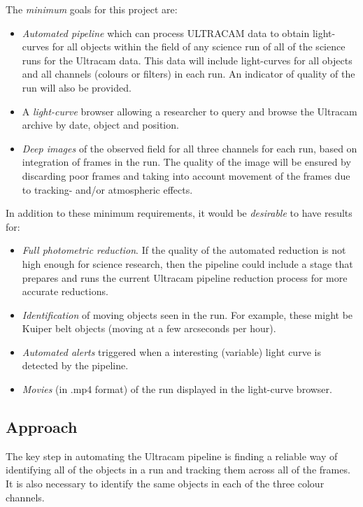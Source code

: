 \documentclass[a4paper,10pt]{article}
\begin{document}
The \emph{minimum} goals for this project are:
\begin{itemize}
	\item \emph{Automated pipeline} which can process ULTRACAM data to obtain light-curves for all objects within the field of any science run of all of the science runs for the Ultracam data. This data will include light-curves for all objects and all channels (colours or filters) in each run. An indicator of quality of the run will also be provided. 
	\item A \emph{light-curve} browser allowing a researcher to query and browse the Ultracam archive by date, object and position.
	\item \emph{Deep images} of the observed field for all three channels for each run, based on integration of frames in the run. The quality of the image will be ensured by discarding poor frames and taking into account movement of the frames due to tracking- and/or atmospheric effects. 
\end{itemize}

In addition to these minimum requirements, it would be \emph{desirable} to have results for:

\begin{itemize}
	\item \emph{Full photometric reduction}. If the quality of the automated reduction is not high enough for science research, then the pipeline could include a stage that prepares and runs the current Ultracam pipeline reduction process for more accurate reductions.
	\item \emph{Identification} of moving objects seen in the run. For example, these might be Kuiper belt objects (moving at a few arcseconds per hour).
	\item \emph{Automated alerts} triggered when a interesting (variable) light curve is detected by the pipeline. 
	\item \emph{Movies} (in .mp4 format) of the run displayed in the light-curve browser. 
\end{itemize}

\subsection{Approach}
The key step in automating the Ultracam pipeline is finding a reliable way of identifying all of the objects in a run and tracking them across all of the frames. It is also necessary to identify the same objects in each of the three colour channels. 
\end{document}
